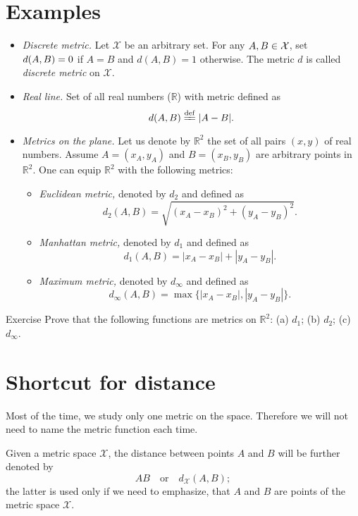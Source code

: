 \section*{Examples}

\begin{itemize}
\item {}\emph{Discrete metric.} Let $\mathcal X$ be an arbitrary set. 
For any $A,B\z\in\mathcal X$, 
set $d(A,B)\z=0$ if $A=B$ and $d(A,B)=1$ otherwise.
The metric $d$ is called \emph{discrete metric} on $\mathcal X$.
\item{}\emph{Real line.} Set of all real numbers ($\mathbb{R}$) with metric defined as 
$$d(A,B)\df|A-B|.$$
\item {}\emph{Metrics on the plane.}
Let us denote by $\mathbb{R}^2$ the set of all pairs $(x,y)$ of real numbers.
Assume $A=(x_A,y_A)$ and $B=(x_B,y_B)$ are arbitrary points in $\mathbb{R}^2$.
One can equip $\mathbb{R}^2$ with the following metrics:
\begin{itemize}
\item{}\emph{Euclidean metric,} denoted by $d_2$ and defined as \label{def:d_2}
$$d_2(A,B)=\sqrt{(x_A-x_B)^2+(y_A-y_B)^2}.$$
\item\label{Manhattan plane}\emph{Manhattan metric,} denoted by $d_1$ and defined as 
$$d_1(A,B)=|x_A-x_B|+|y_A-y_B|.$$
\item{}\emph{Maximum metric,} denoted by $d_\infty$ and defined as 
$$d_\infty(A,B)=\max\{|x_A-x_B|,|y_A-y_B|\}.$$
\end{itemize}
\end{itemize}

\begin{thm}{Exercise}\label{ex:d_1+d_2+d_infty}
Prove that the following functions are metrics on $\mathbb{R}^2$:
(a) $d_1$; (b) $d_2$; (c) $d_\infty$.
\end{thm}


\section*{Shortcut for distance}

Most of the time,  
we study only one metric on the space.
Therefore we will not need to name the metric function each time.

Given a metric space $\mathcal X$,
the distance between points $A$ and $B$ will be further denoted by 
$$AB
\quad
\text{or}
\quad
d_{\mathcal X}(A,B);$$
the latter is used only if we need to emphasize, that $A$ and $B$ are points of the metric space $\mathcal X$.

